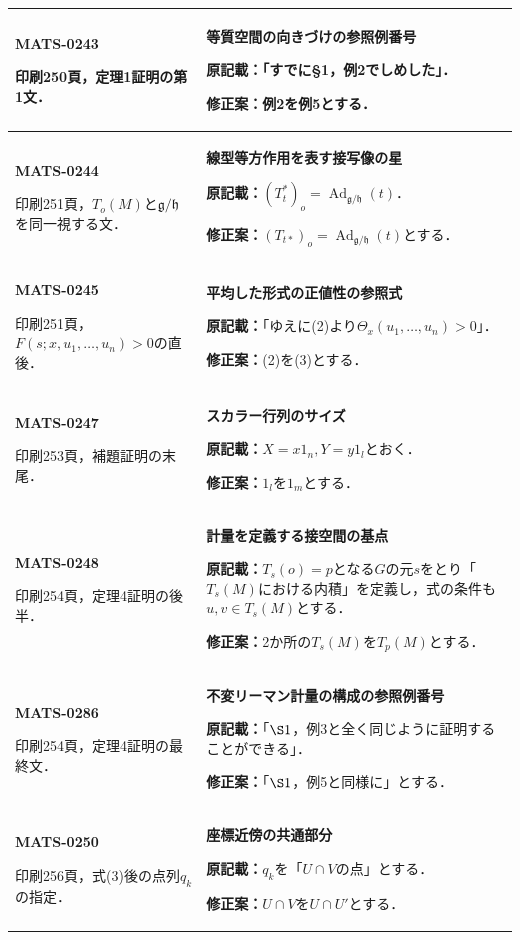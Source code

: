 \documentclass[a4paper,10pt]{ltjsarticle}
\begin{document}
\begin{longtable}{@{}>{\raggedright\arraybackslash}p{.19\linewidth}>{\raggedright\arraybackslash}p{.77\linewidth}@{}}
\hline
\hypertarget{MATS-0243}{}\textbf{MATS-0243}\par 印刷250頁，定理1証明の第1文． & \textbf{等質空間の向きづけの参照例番号}\par\textbf{原記載：}「すでに§1，例2でしめした」．\par\textbf{修正案：}例2を例5とする． \\[3pt]
\hline
\hypertarget{MATS-0244}{}\textbf{MATS-0244}\par 印刷251頁，$T_o(M)$と$\mathfrak g/\mathfrak h$を同一視する文． & \textbf{線型等方作用を表す接写像の星}\par\textbf{原記載：}$(T_t^*)_o=\operatorname{Ad}_{\mathfrak g/\mathfrak h}(t)$．\par\textbf{修正案：}$(T_{t*})_o=\operatorname{Ad}_{\mathfrak g/\mathfrak h}(t)$とする． \\[3pt]
\hline
\hypertarget{MATS-0245}{}\textbf{MATS-0245}\par 印刷251頁，$F(s;x,u_1,\ldots,u_n)>0$の直後． & \textbf{平均した形式の正値性の参照式}\par\textbf{原記載：}「ゆえに(2)より$\Theta_x(u_1,\ldots,u_n)>0$」．\par\textbf{修正案：}(2)を(3)とする． \\[3pt]
\hline
\hypertarget{MATS-0247}{}\textbf{MATS-0247}\par 印刷253頁，補題証明の末尾． & \textbf{スカラー行列のサイズ}\par\textbf{原記載：}$X=x1_n,Y=y1_l$とおく．\par\textbf{修正案：}$1_l$を$1_m$とする． \\[3pt]
\hline
\hypertarget{MATS-0248}{}\textbf{MATS-0248}\par 印刷254頁，定理4証明の後半． & \textbf{計量を定義する接空間の基点}\par\textbf{原記載：}$T_s(o)=p$となる$G$の元$s$をとり「$T_s(M)$における内積」を定義し，式の条件も$u,v\in T_s(M)$とする．\par\textbf{修正案：}2か所の$T_s(M)$を$T_p(M)$とする． \\[3pt]
\hline
\hypertarget{MATS-0286}{}\textbf{MATS-0286}\par 印刷254頁，定理4証明の最終文． & \textbf{不変リーマン計量の構成の参照例番号}\par\textbf{原記載：}「$\S1$，例3と全く同じように証明することができる」．\par\textbf{修正案：}「$\S1$，例5と同様に」とする． \\[3pt]
\hline
\hypertarget{MATS-0250}{}\textbf{MATS-0250}\par 印刷256頁，式(3)後の点列$q_k$の指定． & \textbf{座標近傍の共通部分}\par\textbf{原記載：}$q_k$を「$U\cap V$の点」とする．\par\textbf{修正案：}$U\cap V$を$U\cap U'$とする． \\[3pt]

\end{longtable}
\end{document}
